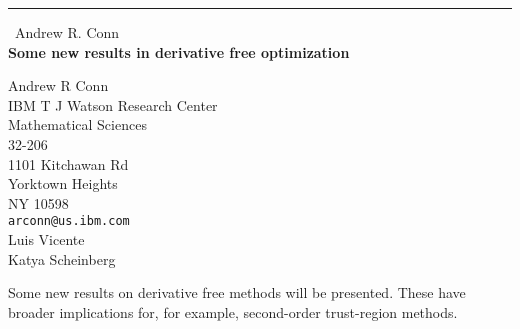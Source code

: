 \documentclass{report}
\begin{document}
\begin{center}
\rule{6in}{1pt} \
{\large Andrew R. Conn \\
{\bf Some new results in derivative free optimization}}

Andrew R Conn \\ IBM T J Watson Research Center \\ Mathematical Sciences \\ 32-206 \\ 1101 Kitchawan Rd  \\ Yorktown Heights \\ NY 10598
\\
{\tt arconn@us.ibm.com}\\
Luis Vicente\\
Katya Scheinberg\end{center}

Some new results on derivative free methods will be presented.
These have broader implications for, for example, second-order
trust-region methods.
\end{document}

